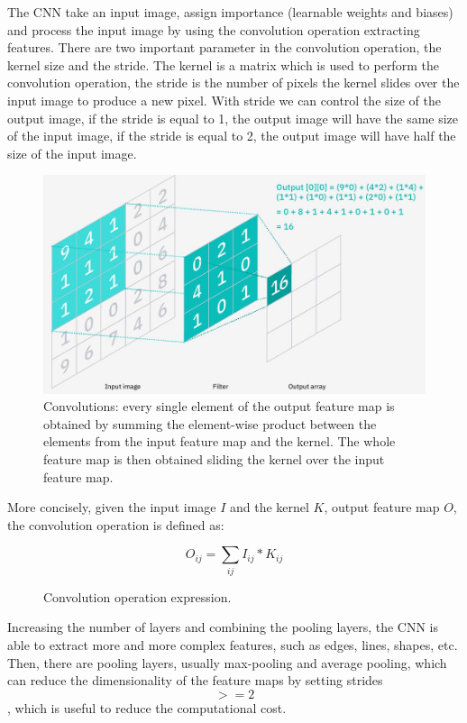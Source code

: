 The CNN take an input image, assign importance (learnable weights and biases) and process the input image by using the convolution operation extracting features.
There are two important parameter in the convolution operation, the kernel size and the stride.
The kernel is a matrix which is used to perform the convolution operation, the stride is the number of pixels the kernel slides over the input image to produce a new pixel.
With stride we can control the size of the output image, if the stride is equal to 1, the output image will have the same size of the input image, if the stride is equal to 2, the output image will have half the size of the input image.
\begin{figure}[H]
    \centering
    \includegraphics[width=\textwidth]{images/2_convolutions}
    \caption{Convolutions: every single element of the output feature map is obtained by summing the element-wise product between the elements from the input feature map and the kernel. The whole feature map is then obtained sliding the kernel over the input feature map.}
    \label{fig:figure-convolutions}
\end{figure}
More concisely, given the input image $I$ and the kernel $K$, output feature map $O$, the convolution operation is defined as:
\begin{figure}[H]
    \[O_{ij} = \sum_{ij} I_{ij} * K_{ij}\]
    \caption{Convolution operation expression.}
    \label{fig:expression-convolution}
\end{figure}
Increasing the number of layers and combining the pooling layers, the CNN is able to extract more and more complex features, such as edges, lines, shapes, etc.
Then, there are pooling layers, usually max-pooling and average pooling, which can reduce the dimensionality of the feature maps by setting strides \[>=2\], which is useful to reduce the computational cost.
